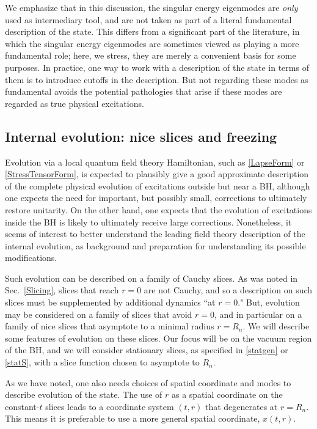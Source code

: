 \documentclass[12pt]{article}
\numberwithin{equation}{section}
\begin{document}
We emphasize that in this discussion, the singular energy eigenmodes are {\it only} used as intermediary tool, and are not taken as part of a literal fundamental description of the state.  
This differs from a significant part of the literature, in which the singular energy eigenmodes are sometimes viewed as playing a more fundamental role; here, we stress, they are merely a convenient basis for some purposes.  In practice, one way to work with a description of the state in terms of them is to introduce cutoffs in the description.  
But not  regarding these modes as fundamental  avoids the potential pathologies that arise if these modes are regarded as true physical excitations.  
 
 

\subsection{Internal evolution: nice slices and freezing}

Evolution via a local quantum field theory Hamiltonian, such as \eqref{LapseForm} or \eqref{StressTensorForm}, is expected to plausibly give a good approximate description of the complete physical evolution of excitations outside but near a BH, although one expects the need for important, but possibly small,  corrections to ultimately restore unitarity\cite{SGmodels,BHQIUE,NVNL,NVU,BHQU}.  On the other hand, one expects that the evolution of excitations inside the BH is likely to ultimately receive large corrections.  Nonetheless, it seems of interest to better understand the leading field theory description of the internal evolution, as background and preparation for understanding its possible modifications.

Such evolution can be described on a family of Cauchy slices.  As was noted in Sec.~\ref{Slicing}, slices that reach $r=0$ are not Cauchy, and so a description on such slices must be supplemented by additional dynamics ``at $r=0$."  But, evolution may be considered on a family of slices that avoid $r=0$, and in particular on a family of nice slices that asymptote to a minimal radius $r=R_n$.  We will describe some features of evolution on these slices.  Our focus will be on the vacuum region of the BH, and we will consider stationary slices, as specified in \eqref{statgen} or \eqref{statS}, with a slice function chosen to asymptote to $R_n$. 

As we have noted, one also needs choices of spatial coordinate and modes to describe evolution of the state.  The use of $r$ as a spatial coordinate on the constant-$t$ slices leads to a coordinate system $(t,r)$ that degenerates at $r=R_n$.  This means it is preferable to use a more general spatial coordinate, $x(t,r)$.  
\end{document}
